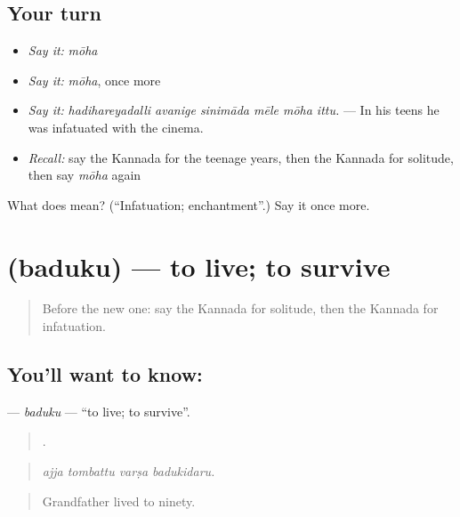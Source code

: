 \subsection*{Your turn}
\begin{itemize}
\raggedright
  \item \emph{Say it:} \emph{mōha}
  \item \emph{Say it:} \emph{mōha}, once more
  \item \emph{Say it:} \emph{hadihareyadalli avanige sinimāda mēle mōha ittu.} — In his teens he was infatuated with the cinema.
  \item \emph{Recall:} say the Kannada for the teenage years, then the Kannada for solitude, then say \emph{mōha} again
\end{itemize}

\begin{tcolorbox}[breakable,colback=teal!4,colframe=teal!35!black,title={Before you move on}]
What does  mean? (\textquotedblleft{}Infatuation; enchantment\textquotedblright{}.) Say it once more.
\end{tcolorbox}
\section[\texorpdfstring{\kn{ಬದುಕು} (baduku)}{ಬದುಕು (baduku)}]{ (baduku) — to live; to survive}

\label{lesson:KA-C529-baduku}



\begin{quote}
Before the new one: say the Kannada for solitude, then the Kannada for infatuation.
\end{quote}

\subsection*{You'll want to know: }
\textbf{} — \emph{baduku} — \textquotedblleft{}to live; to survive\textquotedblright{}.

\begin{quote}
   .
\end{quote}

\begin{quote}
\emph{ajja tombattu varṣa badukidaru.}
\end{quote}

\begin{quote}
Grandfather lived to ninety.
\end{quote}

